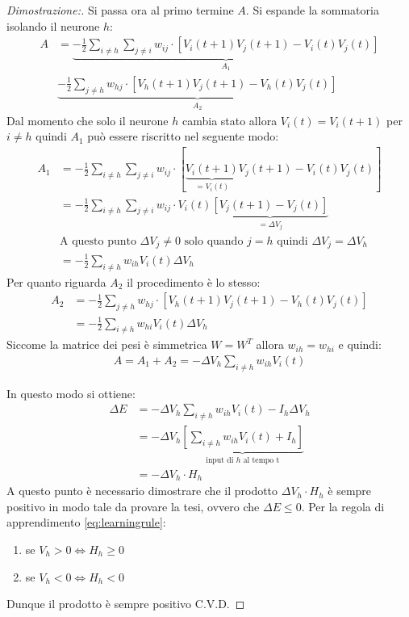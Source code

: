 \begin{proof}[Dimostrazione:]
	Si passa ora al primo termine $A$. Si espande la sommatoria isolando il neurone $h$:
	\begin{align*}
		A &= \underbrace{- \frac{1}{2} \sum_{i \neq h} \sum_{j \neq i} w_{ij} \cdot [V_i(t + 1) V_j(t + 1) - V_i(t) V_j(t)]}_\textrm{$A_1$} \\
		& \underbrace{- \frac{1}{2} \sum_{j \neq h} w_{hj} \cdot [V_h(t + 1) V_j(t + 1) - V_h(t) V_j(t)]}_\textrm{$A_2$}
	\end{align*}
	Dal momento che solo il neurone $h$ cambia stato allora $V_i(t) = V_i(t + 1)$ per $i \neq h$ quindi $A_1$ può essere riscritto nel seguente modo:
	\begin{align*}
		A_1 &= - \frac{1}{2} \sum_{i \neq h} \sum_{j \neq i} w_{ij} \cdot [\underbrace{V_i(t + 1)}_\textrm{$=V_i(t)$} V_j(t + 1) - V_i(t) V_j(t)] \\
		&= - \frac{1}{2} \sum_{i \neq h} \sum_{j \neq i} w_{ij} \cdot V_i(t) \underbrace{[V_j(t + 1) - V_j(t)]}_\textrm{$=\Delta V_j$} \\
		&\text{A questo punto $\Delta V_j \neq 0$ solo quando $j = h$ quindi $\Delta V_j = \Delta V_h$} \\
		&= - \frac{1}{2} \sum_{i \neq h} w_{ih} V_i(t) \Delta V_h
	\end{align*}
	Per quanto riguarda $A_2$ il procedimento è lo stesso:
	\begin{align*}
		A_2 &= - \frac{1}{2} \sum_{j \neq h} w_{hj} \cdot [V_h(t + 1) V_j(t + 1) - V_h(t) V_j(t)] \\
		&= - \frac{1}{2} \sum_{i \neq h} w_{hi} V_i(t) \Delta V_h
	\end{align*}
	Siccome la matrice dei pesi è simmetrica $W = W^T$ allora $w_{ih} = w_{hi}$ e quindi:
	\begin{align*}
		A = A_1 + A_2 = - \Delta V_h \sum_{i \neq h} w_{ih} V_i(t)
	\end{align*}
	
	In questo modo si ottiene:
	\begin{align*}
		\Delta E &= - \Delta V_h \sum_{i \neq h} w_{ih} V_i(t)  - I_h \Delta V_h \\
		&= - \Delta V_h \underbrace{\left[\sum_{i \neq h} w_{ih} V_i(t) + I_h \right]}_\textrm{input di $h$ al tempo t} \\
		&= - \Delta V_h \cdot H_h
	\end{align*}
	A questo punto è necessario dimostrare che il prodotto $\Delta V_h \cdot H_h$ è sempre positivo in modo tale da provare la tesi, ovvero che $\Delta E \leq 0$. Per la regola di apprendimento \eqref{eq:learningrule}:
	\begin{enumerate}
		\item se $V_h > 0 \Leftrightarrow H_h \geq 0$
		\item se $V_h < 0 \Leftrightarrow H_h < 0$
	\end{enumerate}
	Dunque il prodotto è sempre positivo C.V.D.
\end{proof}

